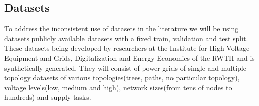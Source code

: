 \subsection*{Datasets}

To address the inconsistent use of datasets in the literature we will be using
datasets publicly available datasets with a fixed train, validation and test split.
These datasets being developed by researchers at the Institute for High Voltage
Equipment and Grids, Digitalization and Energy Economics of the RWTH and is
synthetically generated.
They will consist of power grids of single and multiple topology datasets of various
topologies(trees, paths, no particular topology), voltage levels(low, medium and high),
network sizes(from tens of nodes to hundreds) and supply tasks.
